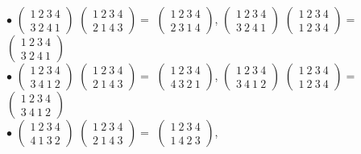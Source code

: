 \documentclass[12pt,a4paper]{scrartcl}
\begin{document}
	$\bullet$
	$\begin{pmatrix}
	1~2~3~4\\
	3~2~4~1
	\end{pmatrix}$
	$\begin{pmatrix}
	1~2~3~4\\
	2~1~4~3
	\end{pmatrix} = $ $\begin{pmatrix}
	1~2~3~4\\
	2~3~1~4
	\end{pmatrix}$, 
	$\begin{pmatrix}
	1~2~3~4\\
	3~2~4~1
	\end{pmatrix}$
	$\begin{pmatrix}
	1~2~3~4\\
	1~2~3~4
	\end{pmatrix} = $
	$\begin{pmatrix}
	1~2~3~4\\
	3~2~4~1	\end{pmatrix}$\\
	$\bullet$
	$\begin{pmatrix}
	1~2~3~4\\
	3~4~1~2
	\end{pmatrix}$
	$\begin{pmatrix}
	1~2~3~4\\
	2~1~4~3
	\end{pmatrix} = $ $\begin{pmatrix}
	1~2~3~4\\
	4~3~2~1
	\end{pmatrix}$, 
	$\begin{pmatrix}
	1~2~3~4\\
	3~4~1~2
	\end{pmatrix}$
	$\begin{pmatrix}
	1~2~3~4\\
	1~2~3~4
	\end{pmatrix} = $
	$\begin{pmatrix}
	1~2~3~4\\
	3~4~1~2	\end{pmatrix}$\\
	$\bullet$
	$\begin{pmatrix}
	1~2~3~4\\
	4~1~3~2
	\end{pmatrix}$
	$\begin{pmatrix}
	1~2~3~4\\
	2~1~4~3
	\end{pmatrix} = $ $\begin{pmatrix}
	1~2~3~4\\
	1~4~2~3
	\end{pmatrix}$, 
\end{document}
